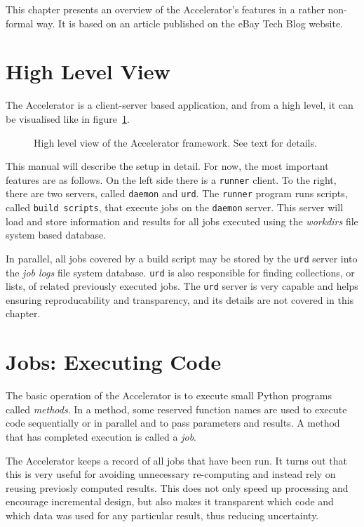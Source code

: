 
This chapter presents an overview of the Accelerator's features in a
rather non-formal way.  It is based on an article published on the
eBay Tech Blog website.



\section{High Level View}

The Accelerator is a client-server based application, and from a high
level, it can be visualised like in figure~\ref{fig:overview}.
\begin{figure}[h!]
  \begin{center}
    
    \caption{High level view of the Accelerator framework.  See text
      for details.}
    \label{fig:overview}
  \end{center}
\end{figure}
This manual will describe the setup in detail.  For now, the most
important features are as follows.  On the left side there is a
\texttt{runner} client.  To the right, there are two servers, called
\texttt{daemon} and \texttt{urd}.  The \texttt{runner} program runs
scripts, called \texttt{build scripts}, that execute jobs on the
\texttt{daemon} server.  This server will load and store information
and results for all jobs executed using the \textsl{workdirs} file
system based database.

In parallel, all jobs covered by a build script may be stored by
the \texttt{urd} server into the \textsl{job logs} file system
database.  \texttt{urd} is also responsible for finding collections,
or lists, of related previously executed jobs.  The \texttt{urd}
server is very capable and helps ensuring reproducability and
transparency, and its details are not covered in this chapter.


\section{Jobs:  Executing Code}
The basic operation of the Accelerator is to execute small Python
programs called \textsl{methods}.  In a method, some reserved function
names are used to execute code sequentially or in parallel and to pass
parameters and results.  A method that has completed execution is
called a \textsl{job}.

The Accelerator keeps a record of all jobs that have been run.  It
turns out that this is very useful for avoiding unnecessary
re-computing and instead rely on reusing previosly computed results.
This does not only speed up processing and encourage incremental
design, but also makes it transparent which code and which data was
used for any particular result, thus reducing uncertainty.

